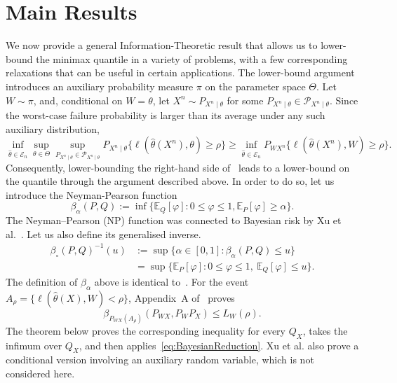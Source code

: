 \documentclass[11pt]{article}
\theoremstyle{definition}
\theoremstyle{remark}
\newcommand{\1}{\boldsymbol{1}}
\begin{document}
\section{Main Results}
\label{sec:main-results}
We now provide a general Information-Theoretic result that allows us to lower-bound the minimax quantile in a variety of problems, with a few corresponding relaxations that can be useful in certain applications. The lower-bound argument introduces an auxiliary probability measure \(\pi\) on the parameter space \(\Theta\). Let \(W\sim\pi\), and, conditional on \(W=\theta\), let \(X^n\sim P_{X^n\mid\theta}\) for some \(P_{X^n\mid\theta}\in\mathscr P_{X^n\mid\theta}\). Since the worst-case failure probability is larger than its average under any such auxiliary distribution,
\begin{equation}
\inf_{\widehat\theta\in\mathcal E_n}
\sup_{\theta\in\Theta}
\sup_{P_{X^n\mid\theta}\in\mathscr P_{X^n\mid\theta}}
P_{X^n\mid\theta}
\{\ell(\widehat\theta(X^n),\theta)\ge\rho\}
\ge
\inf_{\widehat\theta\in\mathcal E_n}
P_{WX^n}
\{\ell(\widehat\theta(X^n),W)\ge\rho\}.\label{eq:BayesianReduction}
\end{equation}
Consequently, lower-bounding the right-hand side of~ leads to a lower-bound on the quantile through the argument described above. In order to do so, let us introduce the Neyman-Pearson function~\cite{NeymanPearson1933,PolyanskiyPoorVerdu2010}
\begin{equation}
    \beta_\alpha(P,Q) := \inf\{ \mathbb{E}_Q[\varphi]: 0\leq \varphi \leq 1, \mathbb E_P[\varphi]\geq \alpha \}.
\end{equation}
The Neyman--Pearson (NP) function was connected to Bayesian risk by
Xu et al.~\cite{XuRaginsky2017}. Let us also define its generalised inverse.
\begin{align}
\beta_{\circ}(P,Q)^{-1}(u)
&:=
\sup\{\alpha\in[0,1]:\beta_\alpha(P,Q)\leq u\}
\\
&=
\sup\{\mathbb E_P[\varphi]:0\leq\varphi\leq1,
\ \mathbb E_Q[\varphi]\leq u\}.
\end{align}
The definition of $\beta_\alpha$ above is identical to~\cite[Eq.~(100)]{PolyanskiyPoorVerdu2010}. For the event $A_\rho=\{\ell(\widehat\theta(X),W)<\rho\}$, Appendix~A of~\cite{XuRaginsky2017} proves
\[
\beta_{P_{WX}(A_\rho)}(P_{WX},P_WP_X)\leq L_W(\rho).
\]
The theorem below proves the corresponding inequality for every $Q_X$, takes the infimum over $Q_X$, and then applies~\eqref{eq:BayesianReduction}. Xu et al. also prove a conditional version involving an auxiliary random variable, which is not considered here.
\end{document}
